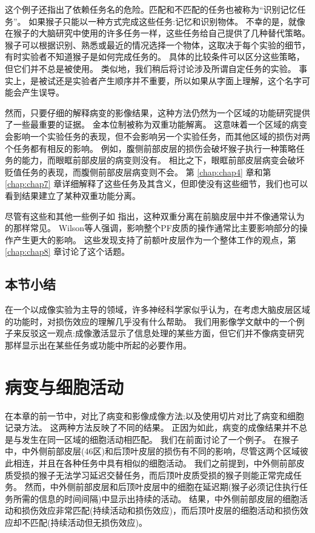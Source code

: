 \par
这个例子还指出了依赖任务名的危险。匹配和不匹配的任务也被称为“识别记忆任务”。
如果猴子只能以一种方式完成这些任务:记忆和识别物体。
不幸的是，就像在猴子的大脑研究中使用的许多任务一样，这些任务给自己提供了几种替代策略。
猴子可以根据识别、熟悉或最近的情况选择一个物体，这取决于每个实验的细节，有时实验者不知道猴子是如何完成任务的。
具体的比较条件可以区分这些策略，但它们并不总是被使用。
类似地，我们稍后将讨论涉及所谓自定任务的实验。
事实上，是被试还是实验者产生顺序并不重要，所以如果从字面上理解，这个名字可能会产生误导。

\par
然而，只要仔细的解释病变的影像结果，这种方法仍然为一个区域的功能研究提供了一些最重要的证据。
金本位制被称为双重功能解离。
这意味着一个区域的病变会影响一个实验任务的表现，但不会影响另一个实验任务，而其他区域的损伤对两个任务都有相反的影响。
例如，腹侧前部皮层的损伤会破坏猴子执行一种策略任务的能力\cite{baxter2009ventrolateral}，而眼眶前部皮层的病变则没有\cite{baxter2007asymmetry,baxter2007orbital}。
相比之下，眼眶前部皮层病变会破坏贬值任务的表现\cite{izquierdo2004bilateral}，而腹侧前部皮层病变则不会\cite{baxter2009ventrolateral}。
第 \ref{chap:chap4} 章和第 \ref{chap:chap7} 章详细解释了这些任务及其含义，但即使没有这些细节，我们也可以看到结果建立了某种双重功能分离。

\par
尽管有这些和其他一些例子如 \cite{gaffan2002interaction}指出，这种双重分离在前脑皮层中并不像通常认为的那样常见。
Wilson等人\cite{wilson2010functional}强调，影响整个PF皮质的操作通常比主要影响部分的操作产生更大的影响。
这些发现支持了前额叶皮层作为一个整体工作的观点，第 \ref{chap:chap8} 章讨论了这个话题。

\subsection{本节小结}
在一个以成像实验为主导的领域，许多神经科学家似乎认为，在考虑大脑皮层区域的功能时，对损伤效应的理解几乎没有什么帮助。
我们用影像学文献中的一个例子来反驳这一观点:成像激活显示了信息处理的某些方面，但它们并不像病变研究那样显示出在某些任务或功能中所起的必要作用。


\section{病变与细胞活动}
在本章的前一节中，对比了病变和影像成像方法;以及使用切片对比了病变和细胞记录方法。
这两种方法反映了不同的结果。
正因为如此，病变的成像结果并不总是与发生在同一区域的细胞活动相匹配。
我们在前面讨论了一个例子。
在猴子中，中外侧前部皮层(46区)和后顶叶皮层的损伤有不同的影响，尽管这两个区域彼此相连，并且在各种任务中具有相似的细胞活动。
我们之前提到，中外侧前部皮质受损的猴子无法学习延迟交替任务，而后顶叶皮质受损的猴子则能正常完成任务。
然而，中外侧前部皮层\cite{KOJIMA1984229}和后顶叶皮层\cite{chafee1998matching}中的细胞在延迟期(猴子必须记住执行任务所需的信息的时间间隔)中显示出持续的活动。
结果，中外侧前部皮层的细胞活动和损伤效应非常匹配(持续活动和损伤效应)，而后顶叶皮层的细胞活动和损伤效应却不匹配(持续活动但无损伤效应)。

